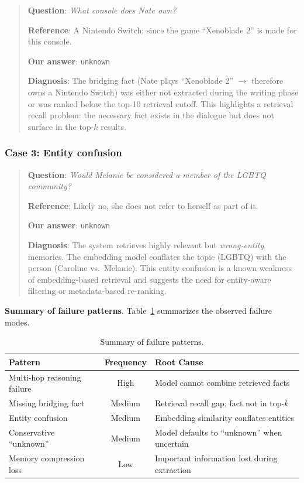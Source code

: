 \documentclass[11pt]{article}
\begin{document}
\begin{quote}
\textbf{Question}: \textit{What console does Nate own?}

\textbf{Reference}: A Nintendo Switch; since the game ``Xenoblade 2'' is made for this console.

\textbf{Our answer}: \texttt{unknown}

\textbf{Diagnosis}: The bridging fact (Nate plays ``Xenoblade 2'' $\rightarrow$ therefore owns a Nintendo Switch) was either not extracted during the writing phase or was ranked below the top-10 retrieval cutoff. This highlights a retrieval recall problem: the necessary fact exists in the dialogue but does not surface in the top-$k$ results.
\end{quote}

\subsubsection{Case 3: Entity confusion}

\begin{quote}
\textbf{Question}: \textit{Would Melanie be considered a member of the LGBTQ community?}

\textbf{Reference}: Likely no, she does not refer to herself as part of it.

\textbf{Our answer}: \texttt{unknown}

\textbf{Diagnosis}: The system retrieves highly relevant but \textit{wrong-entity} memories. The embedding model conflates the topic (LGBTQ) with the person (Caroline vs.\ Melanie). This entity confusion is a known weakness of embedding-based retrieval and suggests the need for entity-aware filtering or metadata-based re-ranking.
\end{quote}

\vspace{4pt}
\noindent
\textbf{Summary of failure patterns}. Table~\ref{tab:failure} summarizes the observed failure modes.

\begin{table}[t]
\centering
\small
\begin{tabular}{lcl}
\toprule
\textbf{Pattern} & \textbf{Frequency} & \textbf{Root Cause} \\
\midrule
Multi-hop reasoning failure & High   & Model cannot combine retrieved facts \\
Missing bridging fact       & Medium & Retrieval recall gap; fact not in top-$k$ \\
Entity confusion            & Medium & Embedding similarity conflates entities \\
Conservative ``unknown''    & Medium & Model defaults to ``unknown'' when uncertain \\
Memory compression loss     & Low    & Important information lost during extraction \\
\bottomrule
\end{tabular}
\caption{Summary of failure patterns.}
\label{tab:failure}
\end{table}
\end{document}
